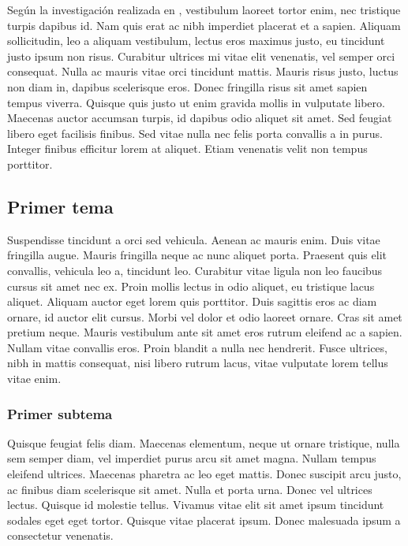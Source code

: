 Según la investigación realizada en \cite{lee2001biomedical}, vestibulum laoreet tortor enim, nec tristique turpis dapibus id. Nam quis erat ac nibh imperdiet placerat et a sapien. Aliquam sollicitudin, leo a aliquam vestibulum, lectus eros maximus justo, eu tincidunt justo ipsum non risus. Curabitur ultrices mi vitae elit venenatis, vel semper orci consequat. Nulla ac mauris vitae orci tincidunt mattis. Mauris risus justo, luctus non diam in, dapibus scelerisque eros. Donec fringilla risus sit amet sapien tempus viverra. Quisque quis justo ut enim gravida mollis in vulputate libero. Maecenas auctor accumsan turpis, id dapibus odio aliquet sit amet. Sed feugiat libero eget facilisis finibus. Sed vitae nulla nec felis porta convallis a in purus. Integer finibus efficitur lorem at aliquet. Etiam venenatis velit non tempus porttitor.

\subsection*{Primer tema}

Suspendisse tincidunt a orci sed vehicula. Aenean ac mauris enim. Duis vitae fringilla augue. Mauris fringilla neque ac nunc aliquet porta. Praesent quis elit convallis, vehicula leo a, tincidunt leo. Curabitur vitae ligula non leo faucibus cursus sit amet nec ex. Proin mollis lectus in odio aliquet, eu tristique lacus aliquet. Aliquam auctor eget lorem quis porttitor. Duis sagittis eros ac diam ornare, id auctor elit cursus. Morbi vel dolor et odio laoreet ornare. Cras sit amet pretium neque. Mauris vestibulum ante sit amet eros rutrum eleifend ac a sapien. Nullam vitae convallis eros. Proin blandit a nulla nec hendrerit. Fusce ultrices, nibh in mattis consequat, nisi libero rutrum lacus, vitae vulputate lorem tellus vitae enim.

\subsubsection*{Primer subtema}

Quisque feugiat felis diam. Maecenas elementum, neque ut ornare tristique, nulla sem semper diam, vel imperdiet purus arcu sit amet magna. Nullam tempus eleifend ultrices. Maecenas pharetra ac leo eget mattis. Donec suscipit arcu justo, ac finibus diam scelerisque sit amet. Nulla et porta urna. Donec vel ultrices lectus. Quisque id molestie tellus. Vivamus vitae elit sit amet ipsum tincidunt sodales eget eget tortor. Quisque vitae placerat ipsum. Donec malesuada ipsum a consectetur venenatis.
